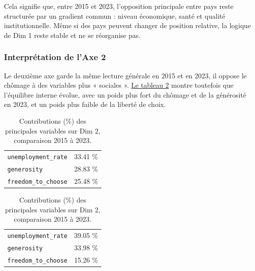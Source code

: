 \documentclass{article}
\begin{document}
Cela signifie que, entre 2015 et 2023, l’opposition principale entre pays reste structurée par un gradient commun : niveau économique, santé et qualité institutionnelle.
Même si des pays peuvent changer de position relative, la logique de Dim 1 reste stable et ne se réorganise pas.

\subsubsection{Interprétation de l'Axe 2}

Le deuxième axe garde la même lecture générale en 2015 et en 2023, il oppose le chômage à des variables plus « sociales ».
\hyperref[tab:dim2_contrib_compare]{Le tableau \ref{tab:dim2_contrib_compare}} montre toutefois que l’équilibre interne évolue, avec un poids plus fort du chômage et de la générosité en 2023, et un poids plus faible de la liberté de choix.

\begin{table}[H]
\centering
\renewcommand{\arraystretch}{1.15}

\begin{minipage}[t]{0.48\textwidth}
\centering
\begin{tabularx}{\linewidth}{>{\raggedright\arraybackslash}X r}
\toprule
\multicolumn{2}{c}{\textbf{Dim 2 (2015)}} \\
\midrule
\texttt{unemployment\_rate} & 33.41 \% \\
\texttt{generosity} & 28.83 \% \\
\texttt{freedom\_to\_choose} & 25.48 \% \\
\bottomrule
\end{tabularx}
\end{minipage}
\hfill
\begin{minipage}[t]{0.48\textwidth}
\centering
\begin{tabularx}{\linewidth}{>{\raggedright\arraybackslash}X r}
\toprule
\multicolumn{2}{c}{\textbf{Dim 2 (2023)}} \\
\midrule
\texttt{unemployment\_rate} & 39.05 \% \\
\texttt{generosity} & 33.98 \% \\
\texttt{freedom\_to\_choose} & 15.26 \% \\
\bottomrule
\end{tabularx}
\end{minipage}

\caption{Contributions (\%) des principales variables sur Dim 2, comparaison 2015 à 2023.}
\label{tab:dim2_contrib_compare}
\end{table}
\end{document}
